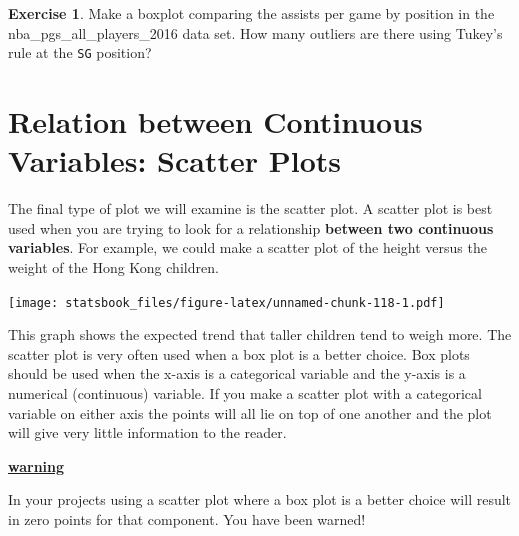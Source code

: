 \documentclass[
]{book}
\newenvironment{Shaded}{\begin{snugshade}}{\end{snugshade}}
\newcommand{\AttributeTok}[1]{\textcolor[rgb]{0.77,0.63,0.00}{#1}}
\newcommand{\FunctionTok}[1]{\textcolor[rgb]{0.00,0.00,0.00}{#1}}
\newcommand{\NormalTok}[1]{#1}
\newcommand{\SpecialCharTok}[1]{\textcolor[rgb]{0.00,0.00,0.00}{#1}}
\newcommand{\StringTok}[1]{\textcolor[rgb]{0.31,0.60,0.02}{#1}}
\newenvironment{rmdblock}[1]
  {\begin{shaded*}
  \centerline{\underline{\textbf{#1}}}

  }
  {
  \end{shaded*}
  }
\newenvironment{warning}
  {\begin{rmdblock}{warning}}
  {\end{rmdblock}}
\theoremstyle{definition}
\theoremstyle{definition}
\theoremstyle{definition}
\newtheorem{exercise}{Exercise}[chapter]
\theoremstyle{definition}
\theoremstyle{remark}
\begin{document}
\begin{exercise}
\protect\hypertarget{exr:unnamed-chunk-117}{}\label{exr:unnamed-chunk-117}Make a boxplot comparing the assists per game by position in the nba\_pgs\_all\_players\_2016 data set. How many outliers are there using Tukey's rule at the \texttt{SG} position?
\end{exercise}

\hypertarget{relation-between-continuous-variables-scatter-plots}{%
\section{Relation between Continuous Variables: Scatter Plots}\label{relation-between-continuous-variables-scatter-plots}}

The final type of plot we will examine is the scatter plot. A scatter plot is best used when you are trying to look for a relationship \textbf{between two continuous variables}. For example, we could make a scatter plot of the height versus the weight of the Hong Kong children.

\begin{Shaded}
\end{Shaded}

\texttt{[image: statsbook\_files/figure-latex/unnamed-chunk-118-1.pdf]}

This graph shows the expected trend that taller children tend to weigh more. The scatter plot is very often used when a box plot is a better choice. Box plots should be used when the x-axis is a categorical variable and the y-axis is a numerical (continuous) variable. If you make a scatter plot with a categorical variable on either axis the points will all lie on top of one another and the plot will give very little information to the reader.

\begin{warning}
In your projects using a scatter plot where a box plot is a better choice will result in zero points for that component. You have been warned!
\end{warning}
\end{document}
